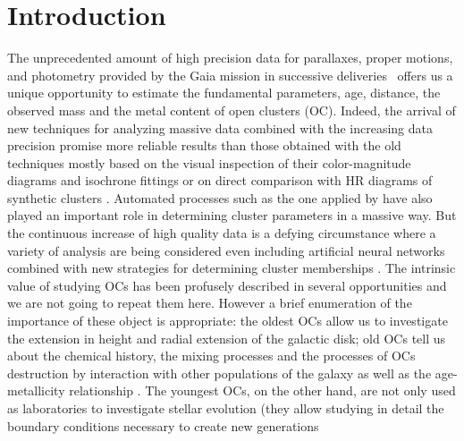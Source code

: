 \documentclass[draft]{aa}
\begin{document}

\maketitle


\section{Introduction}

 The unprecedented amount of high precision data for parallaxes, proper motions,
 and photometry provided by the Gaia mission in successive
 deliveries~\citep[DR2 and EDR3,][]{Gaia_2016,Gaia_EDR3} offers us a unique
 opportunity to estimate the fundamental parameters, age, distance, the observed
 mass and the metal content of open clusters (OC).
 Indeed, the arrival of new techniques for
 analyzing massive data combined with the increasing data precision promise
 more reliable results than those obtained with the old techniques mostly
 based on the visual inspection of their color-magnitude diagrams and
 isochrone fittings \citep{Phelps1994} or on direct comparison with HR diagrams
 of synthetic clusters \citep{Siess1997}. Automated processes such as the one
 applied by \cite{Kharchenko_2012} have also played an important role in
 determining cluster parameters in a massive way. But the continuous increase
 of high quality data is a defying circumstance where a variety of analysis are
 being considered even including artificial neural networks
 \citep{Cantat_2020} combined with new strategies for determining cluster
 memberships \citep{Krone2014,Cantat2018}.
 The intrinsic value of studying OCs has been profusely described in several
 opportunities and we are not going to repeat them here. However a brief
 enumeration of the importance of these object is appropriate: the oldest OCs
 allow us to investigate the extension in height and radial extension of the
 galactic disk; old OCs tell us about the chemical history, the mixing processes
 and the processes of OCs destruction by interaction with other populations of
 the galaxy as well as the age-metallicity relationship 
 \citep{Friel1995,Tosi2004,Hayes2015}. The youngest OCs, on the other hand, are
 not only used as laboratories to investigate stellar evolution (they allow
 studying in detail the boundary conditions necessary to create new generations
\end{document}
